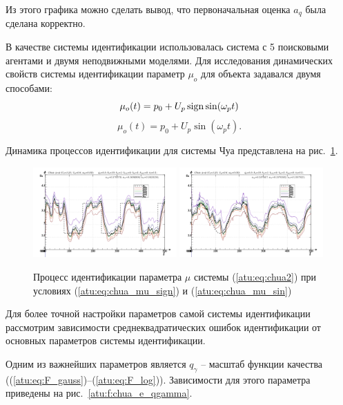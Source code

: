 Из этого графика можно сделать вывод, что первоначальная оценка $a_q$
была сделана корректно.

В качестве системы идентификации использовалась система с 5 поисковыми агентами и
двумя неподвижными моделями. Для исследования динамических свойств системы идентификации
параметр $\mu_o$ для объекта задавался двумя способами:
%
\begin{equation}
 \mu_o(t) = p_0 + U_p \operatorname*{sign} \sin( \omega_p t )
  \label{atu:eq:chua_mu_sign}
\end{equation}
%
\begin{equation}
 \mu_o(t) = p_0 + U_p \sin( \omega_p t ).
  \label{atu:eq:chua_mu_sin}
\end{equation}

Динамика процессов идентификации для системы Чуа представлена на рис.~\ref{atu:f:chua_id}.


\begin{figure}[htb!]
\centerline{
  \includegraphics[width=0.49\textwidth]{p/cha/chua/chua_m5p-pl_n_sign.png}
  \includegraphics[width=0.49\textwidth]{p/cha/chua/chua_m5p-pl_n_sin.png}
}
\caption{Процесс идентификации параметра $\mu$ системы (\ref{atu:eq:chua2})
  при условиях (\ref{atu:eq:chua_mu_sign}) и (\ref{atu:eq:chua_mu_sin})
}
\label{atu:f:chua_id}
\end{figure}

Для более точной настройки параметров самой системы идентификации
рассмотрим зависимости среднеквадратических ошибок идентификации
от основных параметров системы идентификации.

Одним из важнейших параметров является $q_\gamma$ -- масштаб функции качества
((\ref{atu:eq:F_gauss})--(\ref{atu:eq:F_log})).
Зависимости для этого параметра приведены на рис.~\ref{atu:f:chua_e_qgamma}.

